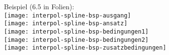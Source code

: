 Beispiel (6.5 in Folien):\\
\texttt{[image: interpol-spline-bsp-ausgang]}\\
\texttt{[image: interpol-spline-bsp-ansatz]}\\
\texttt{[image: interpol-spline-bsp-bedingungen1]}\\
\texttt{[image: interpol-spline-bsp-bedingungen2]}\\
\texttt{[image: interpol-spline-bsp-zusatzbedingungen]}\\









